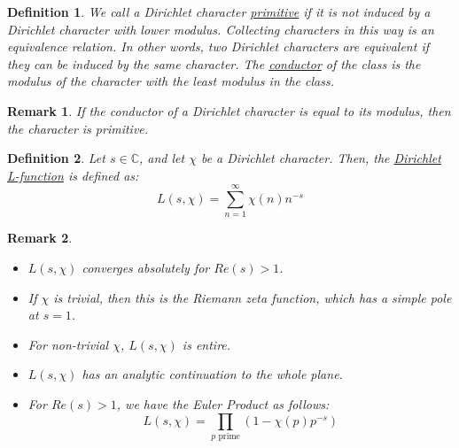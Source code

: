 \documentclass{article}
\newcommand{\C}{\mathbb{C}}
\newtheorem{remark}{Remark}[subsection]
\newtheorem{definition}{Definition}[subsection]
\begin{document}
\begin{definition}
We call a Dirichlet character \underline{primitive} if it is not induced by a Dirichlet character with lower modulus. Collecting characters in this way is an equivalence relation. In other words, two Dirichlet characters are equivalent if they can be induced by the same character. The \underline{conductor} of the class is the modulus of the character with the least modulus in the class. 
\end{definition}
\begin{remark}
If the conductor of a Dirichlet character is equal to its modulus, then the character is primitive.
\end{remark}
\begin{definition}
Let $s\in\C$, and let $\chi$ be a Dirichlet character. Then, the \underline{Dirichlet L-function} is defined as:
$$L(s,\chi)=\sum_{n=1}^\infty \chi(n)n^{-s}$$
\end{definition}
\begin{remark}
\begin{itemize}
\item $L(s,\chi)$ converges absolutely for $Re(s)>1$. 
\item If $\chi$ is trivial, then this is the Riemann zeta function, which has a simple pole at $s=1$.
\item For non-trivial $\chi$, $L(s,\chi)$ is entire. 
\item $L(s,\chi)$ has an analytic continuation to the whole plane.
\item For $Re(s)>1$, we have the Euler Product as follows:
$$L(s,\chi)=\displaystyle\prod_{p\text{ prime}}(1-\chi(p)p^{-s})$$
\end{itemize}
\end{remark}
\newpage
\end{document}
